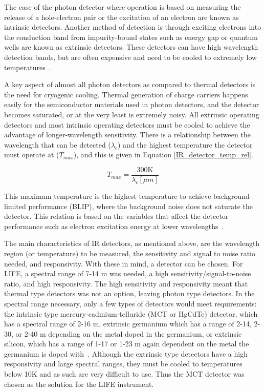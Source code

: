 The case of the photon detector where operation is based on measuring the release of a hole-electron pair or the excitation of an electron are known as intrinsic detectors. Another method of detection is through exciting electrons into the conduction band from impurity-bound states such as energy gap or quantum wells are known as extrinsic detectors. These detectors can have high wavelength detection bands, but are often expensive and need to be cooled to extremely low temperatures~\citep{IR_detector_textbook}.

A key aspect of almost all photon detectors as compared to thermal detectors is the need for cryogenic cooling. Thermal generation of charge carriers happens easily for the semiconductor materials used in photon detectors, and the detector becomes saturated, or at the very least is extremely noisy. All extrinsic operating detectors and most intrinsic operating detectors must be cooled to achieve the advantage of longer-wavelength sensitivity. There is a relationship between the wavelength that can be detected ($\lambda_c$) and the highest temperature the detector must operate at ($T_{max}$), and this is given in Equation \ref{IR_detector_temp_rel}.

\begin{equation}\label{IR_detector_temp_rel}
    T_{max} = \frac{300\mathrm{K}}{\lambda_c[\mu m]}
\end{equation}

This maximum temperature is the highest temperature to achieve background-limited performance (BLIP), where the background noise does not saturate the detector. This relation is based on the variables that affect the detector performance such as electron excitation energy at lower wavelengths~\citep{IR_detector_textbook}. 

The main characteristics of IR detectors, as mentioned above, are the wavelength region (or temperature) to be measured, the sensitivity and signal to noise ratio needed, and responsivity. With these in mind, a detector can be chosen. For LIFE, a spectral range of 7-14 \textmu m was needed, a high sensitivity/signal-to-noise ratio, and high responsivity. The high sensitivity and responsivity meant that thermal type detectors was not an option, leaving photon type detectors. In the spectral range necessary, only a few types of detectors would meet requirements: the intrinsic type mercury-cadmium-telluride (MCT or HgCdTe) detector, which has a spectral range of 2-16 \textmu m, extrinsic germanium which has a range of 2-14, 2-30, or 2-40 \textmu m depending on the metal doped in the germanium, or extrinsic silicon, which has a range of 1-17 or 1-23 \textmu m again dependent on the metal the germanium is doped with~\citep{hamamatsu_ir_detectors}. Although the extrinsic type detectors have a high responsivity and large spectral ranges, they must be cooled to temperatures below 10K and as such are very difficult to use. Thus the MCT detector was chosen as the solution for the LIFE instrument.


